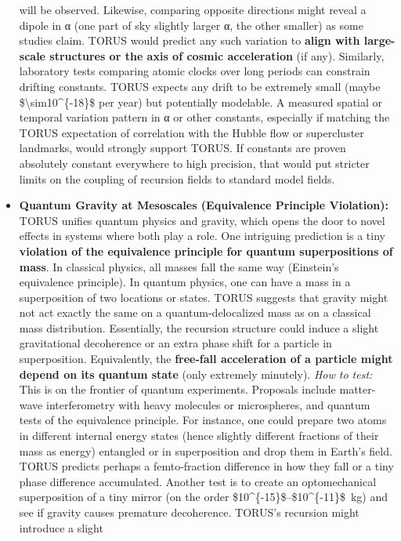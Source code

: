 \documentclass[]{article}
\begin{document}
\begin{itemize}
  will be observed. Likewise, comparing opposite directions might reveal
  a dipole in α (one part of sky slightly larger α, the other smaller)
  as some studies claim. TORUS would predict any such variation to
  \textbf{align with large-scale structures or the axis of cosmic
  acceleration} (if any)​. Similarly, laboratory tests comparing atomic
  clocks over long periods can constrain drifting constants. TORUS
  expects any drift to be extremely small (maybe
  \$\textbackslash{}sim10\^{}\{-18\}\$ per year) but potentially
  modelable. A measured spatial or temporal variation pattern in α or
  other constants, especially if matching the TORUS expectation of
  correlation with the Hubble flow or supercluster landmarks, would
  strongly support TORUS. If constants are proven absolutely constant
  everywhere to high precision, that would put stricter limits on the
  coupling of recursion fields to standard model fields.
\item
  \textbf{Quantum Gravity at Mesoscales (Equivalence Principle
  Violation):} TORUS unifies quantum physics and gravity, which opens
  the door to novel effects in systems where both play a role. One
  intriguing prediction is a tiny \textbf{violation of the equivalence
  principle for quantum superpositions of mass}​. In classical physics,
  all masses fall the same way (Einstein's equivalence principle). In
  quantum physics, one can have a mass in a superposition of two
  locations or states. TORUS suggests that gravity might not act exactly
  the same on a quantum-delocalized mass as on a classical mass
  distribution. Essentially, the recursion structure could induce a
  slight gravitational decoherence or an extra phase shift for a
  particle in superposition. Equivalently, the \textbf{free-fall
  acceleration of a particle might depend on its quantum state} (only
  extremely minutely). \emph{How to test:} This is on the frontier of
  quantum experiments. Proposals include matter-wave interferometry with
  heavy molecules or microspheres, and quantum tests of the equivalence
  principle. For instance, one could prepare two atoms in different
  internal energy states (hence slightly different fractions of their
  mass as energy) entangled or in superposition and drop them in Earth's
  field. TORUS predicts perhaps a femto-fraction difference in how they
  fall or a tiny phase difference accumulated​. Another test is to
  create an optomechanical superposition of a tiny mirror (on the order
  \$10\^{}\{-15\}\$--\$10\^{}\{-11\}\$~kg) and see if gravity causes
  premature decoherence. TORUS's recursion might introduce a slight

\end{itemize}
\end{document}
